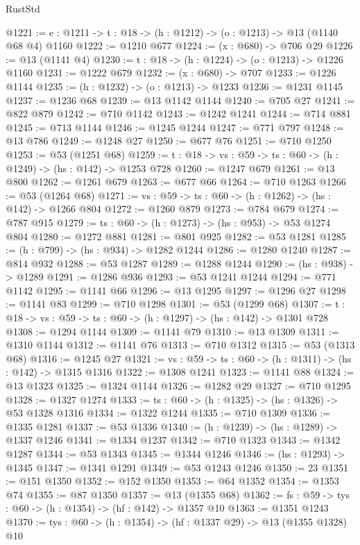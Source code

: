 \begin{lexlean}{RustStd}
\begin{coremodule}
@1221 := {e : @1211} -> {t : @18} -> (h : @1212) -> (o : @1213) -> @13 (@1140 @68 @4) @1160
@1222 := @1210 @677
@1224 := (x : @680) -> @706 @29
@1226 := @13 (@1141 @4)
@1230 := {t : @18} -> (h : @1224) -> (o : @1213) -> @1226 @1160
@1231 := @1222 @679
@1232 := (x : @680) -> @707
@1233 := @1226 @1144
@1235 := (h : @1232) -> (o : @1213) -> @1233
@1236 := @1231 @1145
@1237 := @1236 @68
@1239 := @13 @1142 @1144
@1240 := @705 @27
@1241 := @822 @879
@1242 := @710 @1142
@1243 := @1242 @1241
@1244 := @714 @881
@1245 := @713 @1144
@1246 := @1245 @1244
@1247 := @771 @797
@1248 := @13 @786
@1249 := @1248 @27
@1250 := @677 @76
@1251 := @710 @1250
@1253 := @53 (@1251 @68)
@1259 := {t : @18} -> {vs : @59} -> {ts : @60} -> (h : @1249) -> (hs : @142) -> @1253 @728
@1260 := @1247 @679
@1261 := @13 @800
@1262 := @1261 @679
@1263 := @677 @66
@1264 := @710 @1263
@1266 := @53 (@1264 @68)
@1271 := {vs : @59} -> {ts : @60} -> (h : @1262) -> (hs : @142) -> @1266 @804
@1272 := @1260 @879
@1273 := @784 @679
@1274 := @787 @915
@1279 := {ts : @60} -> (h : @1273) -> (hs : @953) -> @53 @1274 @804
@1280 := @1272 @881
@1281 := @801 @925
@1282 := @53 @1281
@1285 := (h : @799) -> (hs : @934) -> @1282 @1244
@1286 := @1280 @1240
@1287 := @814 @932
@1288 := @53 @1287
@1289 := @1288 @1244
@1290 := (hs : @938) -> @1289
@1291 := @1286 @936
@1293 := @53 @1241 @1244
@1294 := @771 @1142
@1295 := @1141 @66
@1296 := @13 @1295
@1297 := @1296 @27
@1298 := @1141 @83
@1299 := @710 @1298
@1301 := @53 (@1299 @68)
@1307 := {t : @18} -> {vs : @59} -> {ts : @60} -> (h : @1297) -> (hs : @142) -> @1301 @728
@1308 := @1294 @1144
@1309 := @1141 @79
@1310 := @13 @1309
@1311 := @1310 @1144
@1312 := @1141 @76
@1313 := @710 @1312
@1315 := @53 (@1313 @68)
@1316 := @1245 @27
@1321 := {vs : @59} -> {ts : @60} -> (h : @1311) -> (hs : @142) -> @1315 @1316
@1322 := @1308 @1241
@1323 := @1141 @88
@1324 := @13 @1323
@1325 := @1324 @1144
@1326 := @1282 @29
@1327 := @710 @1295
@1328 := @1327 @1274
@1333 := {ts : @60} -> (h : @1325) -> (hs : @1326) -> @53 @1328 @1316
@1334 := @1322 @1244
@1335 := @710 @1309
@1336 := @1335 @1281
@1337 := @53 @1336
@1340 := (h : @1239) -> (hs : @1289) -> @1337 @1246
@1341 := @1334 @1237
@1342 := @710 @1323
@1343 := @1342 @1287
@1344 := @53 @1343
@1345 := @1344 @1246
@1346 := (hs : @1293) -> @1345
@1347 := @1341 @1291
@1349 := @53 @1243 @1246
@1350 := 23
@1351 := @151 @1350
@1352 := @152 @1350
@1353 := @64 @1352
@1354 := @1353 @74
@1355 := @87 @1350
@1357 := @13 (@1355 @68)
@1362 := {fs : @59} -> {tys : @60} -> (h : @1354) -> (hf : @142) -> @1357 @10
@1363 := @1351 @1243
@1370 := {tys : @60} -> (h : @1354) -> (hf : @1337 @29) -> @13 (@1355 @1328) @10

\end{coremodule}
\end{lexlean}
